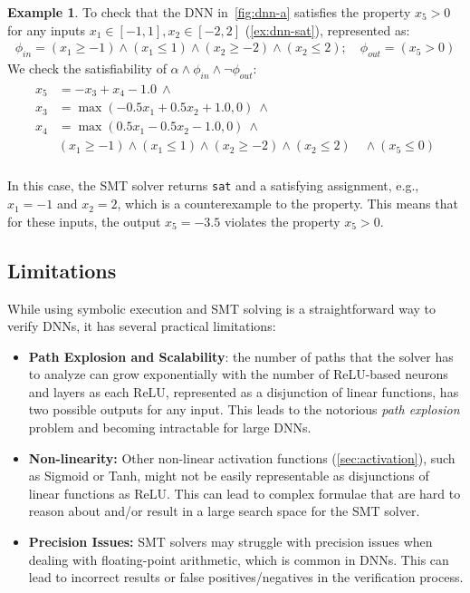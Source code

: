 \documentclass[oneside,11pt,dvipsnames]{book}
\numberwithin{equation}{section}
\theoremstyle{definition}
\newtheorem{example}{Example}[section]
\theoremstyle{remark}
\newcommand{\sat}{\texttt{sat}}
\begin{document}
\begin{example}\label{ex:smt-dnn}
    To check that the DNN in~\autoref{fig:dnn-a} satisfies the property $x_5 > 0$ for any inputs $x_1 \in [-1,1], x_2\in[-2,2]$ (\autoref{ex:dnn-sat}), represented as:
\begin{align*}
\phi_{in} = (x_1 \ge -1) \land (x_1 \le 1) \land (x_2 \ge -2) \land (x_2 \le 2); \quad \phi_{out} = (x_5 > 0)
\end{align*}
We check the satisfiability of $\alpha \land \phi_{in} \land \neg \phi_{out}$:
\begin{align*}
\begin{split}
x_5 &= -x_3 + x_4 - 1.0 ~\land \\
x_3 &= \max(-0.5x_1 + 0.5x_2 + 1.0, 0) ~\land \\
x_4 &= \max(0.5x_1 - 0.5x_2 - 1.0, 0) ~\land \\
    &(x_1 \ge -1) \land (x_1 \le 1) \land (x_2 \ge -2) \land (x_2 \le 2) \quad \land
    (x_5 \le 0) \\
    \end{split}    
\end{align*}    

In this case, the SMT solver returns \sat{} and a satisfying assignment, e.g., $x_1=-1$ and $x_2=2$, which is a counterexample to the property. This means that for these inputs, the output $x_5 = -3.5$ violates the property $x_5 > 0$.
\end{example}

\subsection{Limitations}\label{sec:smt-limitations} 

While using symbolic execution and SMT solving is a straightforward way to verify DNNs, it has several practical limitations:
\begin{itemize}
    \item \textbf{Path Explosion and Scalability}: the number of paths that the solver has to analyze can grow exponentially with the number of ReLU-based neurons and layers as each ReLU, represented as a disjunction of linear functions, has two possible outputs for any input.  This leads to the notorious 
    \emph{path explosion} problem and becoming intractable for large DNNs.
    
    \item \textbf{Non-linearity:} Other non-linear activation functions (\autoref{sec:activation}), such as Sigmoid or Tanh, might not be easily representable as disjunctions of linear functions as ReLU. This can lead to complex formulae that are hard to reason about and/or result in a large search space for the SMT solver.
    
    \item \textbf{Precision Issues:} SMT solvers may struggle with precision issues when dealing with floating-point arithmetic, which is common in DNNs. This can lead to incorrect results or false positives/negatives in the verification process.
\end{itemize}
\end{document}
